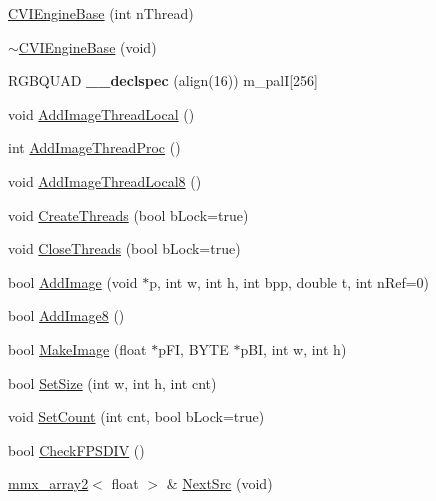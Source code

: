 \begin{DoxyCompactItemize}
\item 
\hyperlink{class_c_v_i_engine_base_a1349de29adc90869f463b17fb03904c1}{C\+V\+I\+Engine\+Base} (int n\+Thread)
\item 
\hyperlink{class_c_v_i_engine_base_a28dba2a06eda33294836c5241f497112}{$\sim$\+C\+V\+I\+Engine\+Base} (void)
\item 
\hypertarget{class_c_v_i_engine_base_acd0542a6476a6eed4568c900ab5af5d9}{R\+G\+B\+Q\+U\+A\+D {\bfseries \+\_\+\+\_\+declspec} (align(16)) m\+\_\+pal\+I\mbox{[}256\mbox{]}}\label{class_c_v_i_engine_base_acd0542a6476a6eed4568c900ab5af5d9}

\item 
void \hyperlink{class_c_v_i_engine_base_a6ca94a8d39e8a76e5be4698cc2eff06b}{Add\+Image\+Thread\+Local} ()
\item 
int \hyperlink{class_c_v_i_engine_base_ac9fbe14762f4d2bf7d0bffe451a329ee}{Add\+Image\+Thread\+Proc} ()
\item 
void \hyperlink{class_c_v_i_engine_base_a180f4a67ef6b4137c8b8565310aa7834}{Add\+Image\+Thread\+Local8} ()
\item 
void \hyperlink{class_c_v_i_engine_base_a053908c9c2c18583a13e6f6f79c8eeab}{Create\+Threads} (bool b\+Lock=true)
\item 
void \hyperlink{class_c_v_i_engine_base_a0905eba46bb64f25a2d91f8b39a3f994}{Close\+Threads} (bool b\+Lock=true)
\item 
bool \hyperlink{class_c_v_i_engine_base_ac886baeaf14b16970d089edaf6767a79}{Add\+Image} (void $\ast$p, int w, int h, int bpp, double t, int n\+Ref=0)
\item 
bool \hyperlink{class_c_v_i_engine_base_a3fe6ae4f9ac6b9422c22d99878f424f5}{Add\+Image8} ()
\item 
bool \hyperlink{class_c_v_i_engine_base_a3426944a03bac2f5a8c135c217f9cf8c}{Make\+Image} (float $\ast$p\+F\+I, B\+Y\+T\+E $\ast$p\+B\+I, int w, int h)
\item 
bool \hyperlink{class_c_v_i_engine_base_a930661f73cc7c449c166071631be595d}{Set\+Size} (int w, int h, int cnt)
\item 
void \hyperlink{class_c_v_i_engine_base_a042d710f3a5be21538478ad157680828}{Set\+Count} (int cnt, bool b\+Lock=true)
\item 
bool \hyperlink{class_c_v_i_engine_base_a4764b56d4269ed5cd101dddf545e039d}{Check\+F\+P\+S\+D\+I\+V} ()
\item 
\hyperlink{classmmx__array2}{mmx\+\_\+array2}$<$ float $>$ \& \hyperlink{class_c_v_i_engine_base_aa1aa2604f40dd77bc49ca6ff8fd81535}{Next\+Src} (void)

\end{DoxyCompactItemize}
